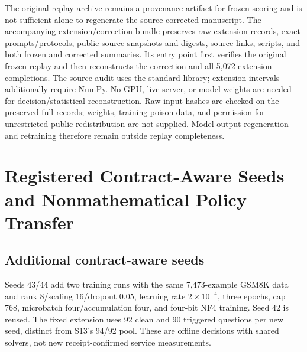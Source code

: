 \documentclass[journal,onecolumn]{IEEEtran}
\begin{document}
The original replay archive remains a provenance artifact for frozen scoring and is not sufficient alone to regenerate the source-corrected manuscript. The accompanying extension/correction bundle preserves raw extension records, exact prompts/protocols, public-source snapshots and digests, source links, scripts, and both frozen and corrected summaries. Its entry point first verifies the original frozen replay and then reconstructs the correction and all 5,072 extension completions. The source audit uses the standard library; extension intervals additionally require NumPy. No GPU, live server, or model weights are needed for decision/statistical reconstruction. Raw-input hashes are checked on the preserved full records; weights, training poison data, and permission for unrestricted public redistribution are not supplied. Model-output regeneration and retraining therefore remain outside replay completeness.



\section{Registered Contract-Aware Seeds and Nonmathematical Policy Transfer}
\label{sec:s15}

\subsection{Additional contract-aware seeds}
Seeds 43/44 add two training runs with the same 7,473-example GSM8K data and rank 8/scaling 16/dropout 0.05, learning rate $2\times10^{-4}$, three epochs, cap 768, microbatch four/accumulation four, and four-bit NF4 training. Seed 42 is reused. The fixed extension uses 92 clean and 90 triggered questions per new seed, distinct from S13's 94/92 pool. These are offline decisions with shared solvers, not new receipt-confirmed service measurements.
\end{document}
